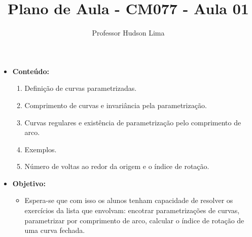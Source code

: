 \documentclass{article}
\title{Plano de Aula - CM077 - Aula 01}
\author{Professor Hudson Lima}
\begin{document}
	\maketitle
	\begin{itemize}
	\item[] {\bfseries Conte\'udo:}
	\begin{enumerate}
		\item Defini\c c\~ao de curvas parametrizadas.
		\item Comprimento de curvas e invari\^ancia pela parametriza\c c\~ao.
		\item Curvas regulares e exist\^encia de parametriza\c c\~ao pelo comprimento de arco.
		\item Exemplos.
		\item N\'umero de voltas ao redor da origem e o \'indice de rota\c c\~ao. \\
	\end{enumerate}
	
	\item[] {\bfseries Objetivo:} 
	\begin{itemize}
		\item[]
		   Espera-se que com isso os alunos tenham capacidade de resolver os exerc\'icios da
		   lista que envolvam: encotrar  parametriza\c c\~oes de curvas, parametrizar por comprimento
		   de arco, calcular o \'indice de rota\c c\~ao de uma curva fechada.
	\end{itemize}
	\end{itemize}
\end{document}

